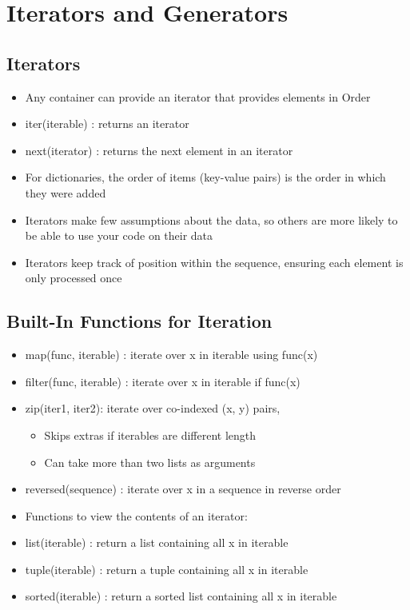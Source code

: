 \chapter{Iterators and Generators}

\section{Iterators}
\begin{itemize}
    \item Any container can provide an iterator that provides elements in Order
    \item iter(iterable) : returns an iterator
    \item next(iterator) : returns the next element in an iterator
    \item For dictionaries, the order of items (key-value pairs) is the order in which they were added
    \item Iterators make few assumptions about the data, so others are more likely to be able to use your code on their data
    \item Iterators keep track of position within the sequence, ensuring each element is only processed once
\end{itemize}

\section{Built-In Functions for Iteration}
\begin{itemize}
    \item map(func, iterable) : iterate over x in iterable using func(x)
    \item filter(func, iterable) : iterate over x in iterable if func(x)
    \item zip(iter1, iter2): iterate over co-indexed (x, y) pairs, 
    \begin{itemize}
        \item Skips extras if iterables are different length
        \item Can take more than two lists as arguments
    \end{itemize}
    \item reversed(sequence) : iterate over x in a sequence in reverse order
    \item Functions to view the contents of an iterator:
    \item list(iterable) : return a list containing all x in iterable
    \item tuple(iterable) : return a tuple containing all x in iterable
    \item sorted(iterable) : return a sorted list containing all x in iterable
\end{itemize}

